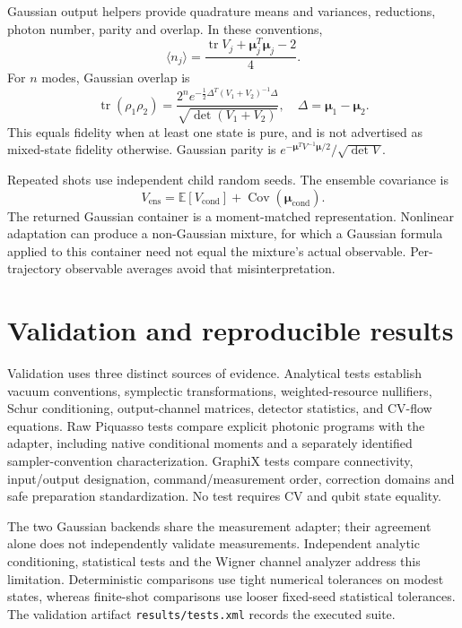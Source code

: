 \documentclass[a4paper,twocolumn,11pt,nopdfoutputerror]{quantumarticle}
\newcommand{\tr}{\operatorname{tr}}
\newcommand{\Cov}{\operatorname{Cov}}
\begin{document}
Gaussian output helpers provide quadrature means and variances, reductions,
photon number, parity and overlap. In these conventions,
\begin{equation}
 \langle n_j\rangle=\frac{\tr V_j+\bm\mu_j^T\bm\mu_j-2}{4}.
\end{equation}
For $n$ modes, Gaussian overlap is
\begin{equation}
 \tr(\rho_1\rho_2)=
 \frac{2^n e^{-\frac12\Delta^T(V_1+V_2)^{-1}\Delta}}
 {\sqrt{\det(V_1+V_2)}},\quad \Delta=\bm\mu_1-\bm\mu_2.
\end{equation}
This equals fidelity when at least one state is pure, and is not advertised as
mixed-state fidelity otherwise. Gaussian parity is
$e^{-\bm\mu^TV^{-1}\bm\mu/2}/\sqrt{\det V}$.

Repeated shots use independent child random seeds. The ensemble covariance is
\begin{equation}
 V_{\mathrm{ens}}=\mathbb E[V_{\mathrm{cond}}]
                  +\Cov(\bm\mu_{\mathrm{cond}}).
\end{equation}
The returned Gaussian container is a moment-matched representation. Nonlinear
adaptation can produce a non-Gaussian mixture, for which a Gaussian formula
applied to this container need not equal the mixture's actual observable.
Per-trajectory observable averages avoid that misinterpretation.



\section{Validation and reproducible results}

Validation uses three distinct sources of evidence. Analytical tests establish
vacuum conventions, symplectic transformations, weighted-resource nullifiers,
Schur conditioning, output-channel matrices, detector statistics, and CV-flow
equations. Raw Piquasso tests compare explicit photonic programs with the
adapter, including native conditional moments and a separately identified
sampler-convention characterization. GraphiX tests compare connectivity,
input/output designation, command/measurement order, correction domains and
safe preparation standardization. No test requires CV and qubit state equality.

The two Gaussian backends share the measurement adapter; their agreement alone
does not independently validate measurements. Independent analytic conditioning,
statistical tests and the Wigner channel analyzer address this limitation.
Deterministic comparisons use tight numerical tolerances on modest states,
whereas finite-shot comparisons use looser fixed-seed statistical tolerances.
The validation artifact \texttt{results/tests.xml} records the executed suite.
\end{document}
